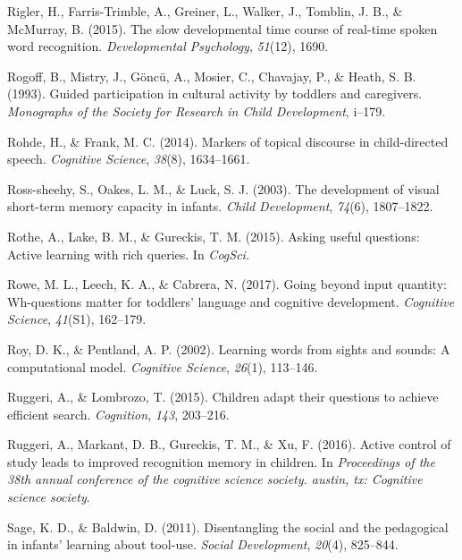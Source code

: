\documentclass[oneside]{report}
\begin{document}
\hypertarget{ref-rigler2015slow}{}
Rigler, H., Farris-Trimble, A., Greiner, L., Walker, J., Tomblin, J. B.,
\& McMurray, B. (2015). The slow developmental time course of real-time
spoken word recognition. \emph{Developmental Psychology}, \emph{51}(12),
1690.

\hypertarget{ref-rogoff1993guided}{}
Rogoff, B., Mistry, J., Göncü, A., Mosier, C., Chavajay, P., \& Heath,
S. B. (1993). Guided participation in cultural activity by toddlers and
caregivers. \emph{Monographs of the Society for Research in Child
Development}, i--179.

\hypertarget{ref-rohde2014markers}{}
Rohde, H., \& Frank, M. C. (2014). Markers of topical discourse in
child-directed speech. \emph{Cognitive Science}, \emph{38}(8),
1634--1661.

\hypertarget{ref-ross2003development}{}
Ross-sheehy, S., Oakes, L. M., \& Luck, S. J. (2003). The development of
visual short-term memory capacity in infants. \emph{Child Development},
\emph{74}(6), 1807--1822.

\hypertarget{ref-rothe2015asking}{}
Rothe, A., Lake, B. M., \& Gureckis, T. M. (2015). Asking useful
questions: Active learning with rich queries. In \emph{CogSci}.

\hypertarget{ref-rowe2017going}{}
Rowe, M. L., Leech, K. A., \& Cabrera, N. (2017). Going beyond input
quantity: Wh-questions matter for toddlers' language and cognitive
development. \emph{Cognitive Science}, \emph{41}(S1), 162--179.

\hypertarget{ref-roy2002learning}{}
Roy, D. K., \& Pentland, A. P. (2002). Learning words from sights and
sounds: A computational model. \emph{Cognitive Science}, \emph{26}(1),
113--146.

\hypertarget{ref-ruggeri2015children}{}
Ruggeri, A., \& Lombrozo, T. (2015). Children adapt their questions to
achieve efficient search. \emph{Cognition}, \emph{143}, 203--216.

\hypertarget{ref-ruggeri2016active}{}
Ruggeri, A., Markant, D. B., Gureckis, T. M., \& Xu, F. (2016). Active
control of study leads to improved recognition memory in children. In
\emph{Proceedings of the 38th annual conference of the cognitive science
society. austin, tx: Cognitive science society}.

\hypertarget{ref-sage2011disentangling}{}
Sage, K. D., \& Baldwin, D. (2011). Disentangling the social and the
pedagogical in infants' learning about tool-use. \emph{Social
Development}, \emph{20}(4), 825--844.
\end{document}
